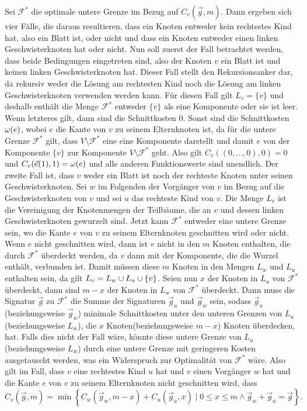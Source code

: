 Sei $\mathcal{F}^*$ die optimale untere Grenze im Bezug auf $C_v(\vec{g}, m)$. Dann ergeben sich vier Fälle, die daraus resultieren, dass ein Knoten entweder kein rechtestes Kind hat, also ein Blatt ist, oder nicht und dass ein Knoten entweder einen linken Geschwisterknoten hat oder nicht.
Nun soll zuerst der Fall betrachtet werden, dass beide Bedingungen eingetreten sind, also der Knoten $v$ ein Blatt ist und keinen linken Geschwisterknoten hat.
Dieser Fall stellt den Rekursionsanker dar, da rekursiv weder die Lösung am rechtesten Kind noch die Lösung am linken Geschwisterknoten verwenden werden kann.
Für diesen Fall gilt $L_v = \{v\}$ und deshalb enthält die Menge $\mathcal{F}^*$ entweder $\{v\}$ als eine Komponente oder sie ist leer.
Wenn letzteres gilt, dann sind die Schnittkosten $0$.
Sonst sind die Schnittkosten $\omega(e)$, wobei $e$ die Kante von $v$ zu seinem Elternknoten ist, da für die untere Grenze $\mathcal{F}^*$ gilt, dass $V \setminus \mathcal{F}^*$ eine eine Komponente darstellt und damit $e$ von der Komponente $\{v\}$ zur Komponente $V \setminus \mathcal{F}^*$ geht.
Also gilt $C_v((0,\ldots,0), 0) = 0$ und $C_v(\vec{e}(1), 1) = \omega(e)$ und alle anderen Funktionswerte sind unendlich.
Der zweite Fall ist, dass $v$ weder ein Blatt ist noch der rechteste Knoten unter seinen Geschwisterknoten. Sei $w$ im Folgenden der Vorgänger von $v$ im Bezug auf die Geschwisterknoten von $v$ und sei $u$ das rechteste Kind von $v$. 
Die Menge $L_v$ ist die Vereinigung der Knotenmengen der Teilbäume, die an $v$ und dessen linken Geschwisterknoten gewurzelt sind.
Jetzt kann $\mathcal{F}^*$ entweder eine untere Grenze sein, wo die Kante $e$ von $v$ zu seinem Elternknoten geschnitten wird oder nicht.
Wenn $e$ nicht geschnitten wird, dann ist $v$ nicht in den $m$ Knoten enthalten, die durch $\mathcal{F}^*$ überdeckt werden, da $v$ dann mit der Komponente, die die Wurzel enthält, verbunden ist.
Damit müssen diese $m$ Knoten in den Mengen $L_w$ und $L_u$ enthalten sein, da gilt $L_v = L_w \cup L_u \cup \{v\}$.
Seien nun $x$ der Knoten in $L_u$ von $\mathcal{F}^*$ überdeckt, dann sind $m - x$ der Knoten in $L_w$ von $\mathcal{F}^*$ überdeckt.
Dann muss die Signatur $\vec{g}$ zu $\mathcal{F}^*$ die Summe der Signaturen $\vec{g}_u$ und $\vec{g}_w$ sein, sodass $\vec{g}_u$(beziehungsweise $\vec{g}_w$) minimale Schnittkosten unter den unteren Grenzen von $L_u$(beziehungsweise $L_w$), die $x$ Knoten(beziehungsweise $m - x$) Knoten überdecken, hat.
Falls dies nicht der Fall wäre, könnte diese untere Grenze von $L_u$(beziehungsweise $L_w$) durch eine untere Grenze mit geringeren Kosten ausgetauscht werden, was ein Widerspruch zur Optimalität von $\mathcal{F}^*$ wäre.
Also gilt im Fall, dass $v$ eine rechtestes Kind $u$ hat und $v$ einen Vorgänger $w$ hat und die Kante $e$ von $v$ zu seinem Elternknoten nicht geschnitten wird, dass 
\begin{equation} \label{eq:e_not_cut}
    C_v(\vec{g}, m) = \min \left\{ C_w(\vec{g}_w, m - x) + C_u(\vec{g}_u, x) \mid 0 \leq x \leq m \land \vec{g}_w + \vec{g}_u = \vec{g} \right\}.
\end{equation}

